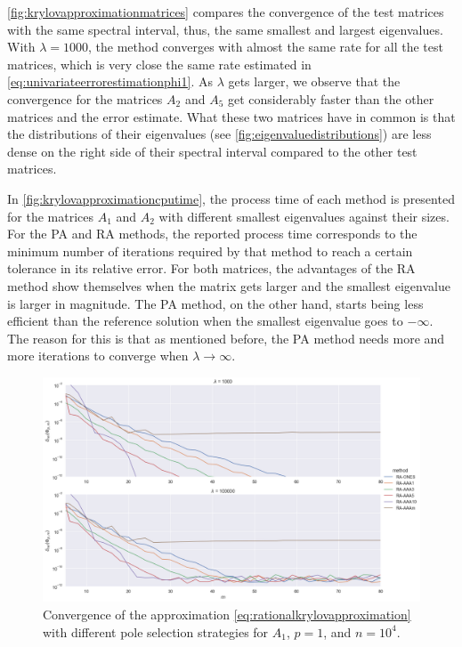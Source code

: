 \autoref{fig:krylovapproximationmatrices} compares the convergence of the
test matrices with the same spectral interval, thus, the same smallest and largest
eigenvalues.
With $\lambda = 1000$, the method converges with almost the same rate for all
the test matrices, which is very close the same rate estimated in
\eqref{eq:univariateerrorestimationphi1}.
As $\lambda$ gets larger, we observe that the convergence for the matrices
$A_2$ and $A_5$ get considerably faster than the other matrices and the error estimate.
What these two matrices have in common is that the distributions of their eigenvalues
(see \autoref{fig:eigenvaluedistributions}) are less dense on the right side of their
spectral interval compared to the other test matrices.

In \autoref{fig:krylovapproximationcputime}, the process time of each method is presented for
the matrices $A_1$ and $A_2$ with different smallest eigenvalues against their sizes. For
the PA and RA methods, the reported process time corresponds to the minimum number of
iterations required by that method to reach a certain tolerance in its relative error.
For both matrices, the advantages of the RA method show themselves when the matrix gets
larger and the smallest eigenvalue is larger in magnitude. The PA method, on the other hand,
starts being less efficient than the reference solution when the smallest eigenvalue goes
to $-\infty$. The reason for this is that as mentioned before, the PA method needs more
and more iterations to converge when $\lambda \to \infty$.

\begin{figure}[h]
    \centering
    \includegraphics[width=.9\textwidth]{img/AAA/cnvg_poles_n10000_eigs.png}
    \caption{
        Convergence of the approximation \eqref{eq:rationalkrylovapproximation} with different
        pole selection strategies for $A_1$, $p=1$, and $n=10^4$.
    }
    \label{fig:rationalkrylovpoleselection}
\end{figure}

